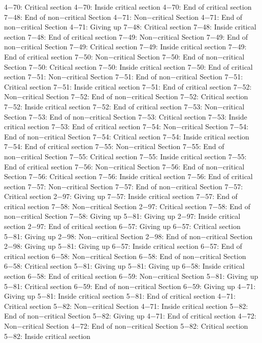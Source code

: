 4−70: Critical section
4−70: Inside critical section
4−70: End of critical section
7−48: End of non−critical Section
4−71: Non−critical Section
4−71: End of non−critical Section
4−71: Giving up
7−48: Critical section
7−48: Inside critical section
7−48: End of critical section
7−49: Non−critical Section
7−49: End of non−critical Section
7−49: Critical section
7−49: Inside critical section
7−49: End of critical section
7−50: Non−critical Section
7−50: End of non−critical Section
7−50: Critical section
7−50: Inside critical section
7−50: End of critical section
7−51: Non−critical Section
7−51: End of non−critical Section
7−51: Critical section
7−51: Inside critical section
7−51: End of critical section
7−52: Non−critical Section
7−52: End of non−critical Section
7−52: Critical section
7−52: Inside critical section
7−52: End of critical section
7−53: Non−critical Section
7−53: End of non−critical Section
7−53: Critical section
7−53: Inside critical section
7−53: End of critical section
7−54: Non−critical Section
7−54: End of non−critical Section
7−54: Critical section
7−54: Inside critical section
7−54: End of critical section
7−55: Non−critical Section
7−55: End of non−critical Section
7−55: Critical section
7−55: Inside critical section
7−55: End of critical section
7−56: Non−critical Section
7−56: End of non−critical Section
7−56: Critical section
7−56: Inside critical section
7−56: End of critical section
7−57: Non−critical Section
7−57: End of non−critical Section
7−57: Critical section
2−97: Giving up
7−57: Inside critical section
7−57: End of critical section
7−58: Non−critical Section
2−97: Critical section
7−58: End of non−critical Section
7−58: Giving up
5−81: Giving up
2−97: Inside critical section
2−97: End of critical section
6−57: Giving up
6−57: Critical section
5−81: Giving up
2−98: Non−critical Section
2−98: End of non−critical Section
2−98: Giving up
5−81: Giving up
6−57: Inside critical section
6−57: End of critical section
6−58: Non−critical Section
6−58: End of non−critical Section
6−58: Critical section
5−81: Giving up
5−81: Giving up
6−58: Inside critical section
6−58: End of critical section
6−59: Non−critical Section
5−81: Giving up
5−81: Critical section
6−59: End of non−critical Section
6−59: Giving up
4−71: Giving up
5−81: Inside critical section
5−81: End of critical section
4−71: Critical section
5−82: Non−critical Section
4−71: Inside critical section
5−82: End of non−critical Section
5−82: Giving up
4−71: End of critical section
4−72: Non−critical Section
4−72: End of non−critical Section
5−82: Critical section
5−82: Inside critical section
